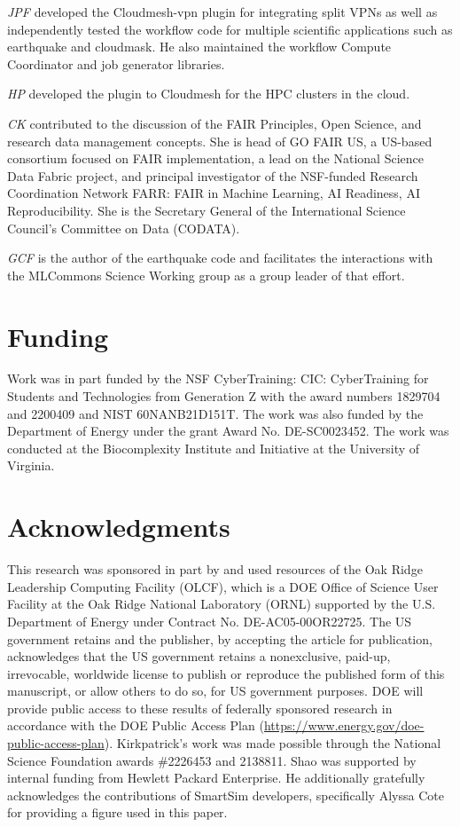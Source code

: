 \documentclass[sigconf]{acmart}
\begin{document}
{\em JPF} developed the Cloudmesh-vpn plugin for integrating split VPNs as well as independently tested the workflow code for multiple scientific applications such as earthquake and cloudmask. He also maintained the workflow Compute Coordinator and job generator libraries.

{\em HP} developed the plugin to Cloudmesh for the HPC clusters in the cloud. 

{\em CK} contributed to the discussion of the FAIR Principles, Open Science, and research data management concepts. She is head of GO FAIR US, a US-based consortium focused on FAIR implementation, a lead on the National Science Data Fabric project, and principal investigator of the NSF-funded Research Coordination Network FARR: FAIR in Machine Learning, AI Readiness, AI Reproducibility. She is the Secretary General of the International Science Council's Committee on Data (CODATA).

{\em GCF} is the author of the earthquake code and facilitates the interactions with the MLCommons Science Working group as a group leader of that effort. 

\section*{Funding}

Work was in part funded by the NSF CyberTraining: CIC: CyberTraining for Students and Technologies from Generation Z with the award numbers 1829704 and 2200409 and NIST 60NANB21D151T.  The work was also funded by the Department of Energy under the grant Award No. DE-SC0023452. The work was conducted at the Biocomplexity Institute and Initiative at the University of Virginia.

\section*{Acknowledgments}

This research was sponsored in part by and used resources of the Oak Ridge Leadership Computing Facility (OLCF), which is a DOE Office of Science User Facility at the Oak Ridge National Laboratory (ORNL) supported by the U.S. Department of Energy under Contract No. DE-AC05-00OR22725. The US government retains and the publisher, by accepting the article for publication, acknowledges that the US government retains a nonexclusive, paid-up, irrevocable, worldwide license to publish or reproduce the published form of this manuscript, or allow others to do so, for US government purposes. DOE will provide public access to these results of federally sponsored research in accordance with the DOE Public Access Plan (\url{https://www.energy.gov/doe-public-access-plan}). Kirkpatrick's work was made possible through the National Science Foundation awards \#2226453 and 2138811. Shao was supported by internal funding from Hewlett Packard Enterprise. He additionally gratefully acknowledges the contributions of SmartSim developers, specifically Alyssa Cote for providing a figure used in this paper.
\end{document}
